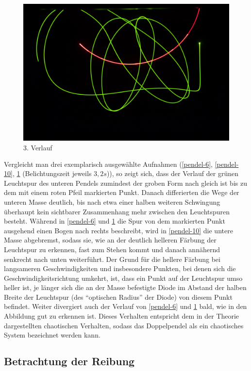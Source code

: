 \begin{figure}
        \includegraphics[width=.9\textwidth]{images/pendel-9}
\caption{3. Verlauf}
\label{pendel-9}
\end{figure}



Vergleicht man drei exemplarisch ausgewählte Aufnahmen (\ref{pendel-6}, \ref{pendel-10}, \ref{pendel-9} (Belichtungszeit jeweils $3,2s$)), so zeigt sich, dass der Verlauf der grünen Leuchtspur des unteren Pendels zumindest der groben Form nach gleich ist bis zu dem mit einem roten Pfeil markierten Punkt. Danach differierten die Wege der unteren Masse deutlich, bis nach etwa einer halben weiteren Schwingung überhaupt kein sichtbarer Zusammenhang mehr zwischen den Leuchtspuren besteht. Während in \ref{pendel-6} und \ref{pendel-9} die Spur von dem markierten Punkt ausgehend einen Bogen nach rechts beschreibt, wird in \ref{pendel-10} die untere Masse abgebremst, sodass sie, wie an der deutlich helleren Färbung der Leuchtspur zu erkennen, fast zum Stehen kommt und danach annähernd senkrecht nach unten weiterführt. Der Grund für die hellere Färbung bei langsameren Geschwindigkeiten und insbesondere Punkten, bei denen sich die Geschwindigkeitsrichtung umkehrt, ist, dass ein Punkt auf der Leuchtspur umso heller ist, je länger sich die an der Masse befestigte Diode im Abstand der halben Breite der Leuchtspur (des \enquote{optischen Radius} der Diode) von diesem Punkt befindet. 
Weiter divergiert auch der Verlauf von \ref{pendel-6} und \ref{pendel-9} bald, wie in den Abbildung gut zu erkennen ist. 
Dieses Verhalten entspricht dem in der Theorie dargestellten chaotischen Verhalten, sodass das Doppelpendel als ein chaotisches System bezeichnet werden kann. 

\subsection{Betrachtung der Reibung}

